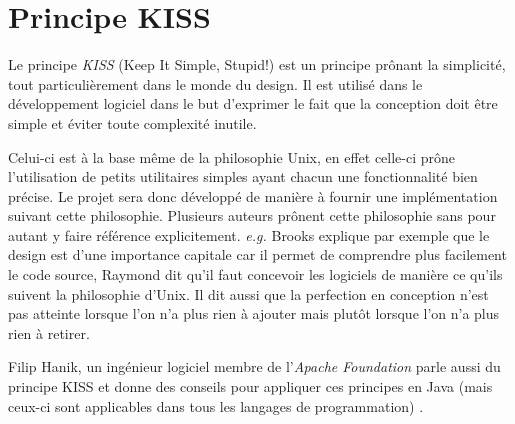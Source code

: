 \chapter{Principe KISS}\label{ann:kiss}
\renewcommand{\leftmark}{ANNEXE \thechapter.~~Principe KISS}
\label{annexe2}
Le principe \emph{KISS} (Keep It Simple, Stupid!) \cite{wiki:kiss} est un
principe prônant la simplicité, tout particulièrement dans le monde du design.
Il est utilisé dans le développement logiciel dans le but d'exprimer le fait
que la conception doit être simple et éviter toute complexité inutile.

Celui-ci est à la base même de la philosophie Unix, en effet celle-ci prône
l'utilisation de petits utilitaires simples ayant chacun une fonctionnalité
bien précise. Le projet sera donc développé de manière à fournir
une implémentation suivant cette philosophie. Plusieurs auteurs
\cite{Brooks1995, Raymond2001} prônent cette philosophie sans pour autant
y faire référence explicitement. \emph{e.g.} Brooks explique par exemple
que le design est d'une importance capitale car il permet de comprendre
plus facilement le code source, Raymond dit qu'il faut concevoir les logiciels
de manière ce qu'ils suivent la philosophie d'Unix. Il dit aussi que
la perfection en conception n'est pas atteinte lorsque l'on n'a plus rien à
ajouter mais plutôt lorsque l'on n'a plus rien à retirer.

Filip Hanik, un ingénieur logiciel membre de l'\emph{Apache Foundation} parle
aussi du principe KISS et donne des conseils pour appliquer ces principes en
Java (mais ceux-ci sont applicables dans tous les langages de programmation)
\cite{fhanikKISS}.
